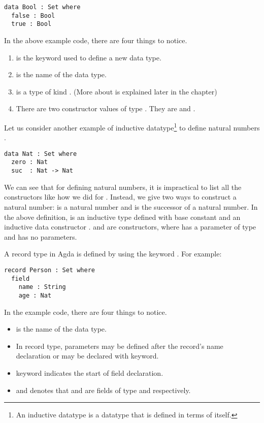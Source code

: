 \begin{verbatim}
data Bool : Set where
  false : Bool 
  true : Bool
\end{verbatim}

In the above example code, there are four things to notice.
\begin{enumerate}
  \item {} is the keyword used to define a new data type. 
  \item {} is the name of the data type.
  \item {} is a type of kind . (More about  is explained later in the chapter)
  \item There are two constructor values of type . They are
   and .
\end{enumerate} 

Let us consider another example of inductive datatype\footnote{An inductive
datatype is a datatype that is defined in terms of itself.} to define natural
numbers . 

\begin{verbatim}
data Nat : Set where
  zero : Nat
  suc  : Nat -> Nat
\end{verbatim}
\label{code:Nat}

We can see that for defining natural numbers, it is impractical to list all the
constructors like how we did for . Instead, we give two ways to
construct a natural number:  is a natural number and 
is the successor of a natural number. In the above definition,  is
an inductive type defined with base constant  and an inductive data
constructor .  and  are constructors, where
 has a parameter of type  and  has no
parameters. 

A record type in Agda is defined by using the keyword . For
example:

\begin{verbatim}
record Person : Set where
  field
    name : String
    age : Nat
\end{verbatim}

In the example code, there are four things to notice.
\begin{itemize}
  \item {} is the name of the data type.
  \item In record type, parameters may be defined after the record's name
  declaration or may be declared with  keyword.
  \item {} keyword indicates the start of field declaration.
  \item {} and  denotes that 
  and  are fields of type  and 
  respectively.
\end{itemize}

